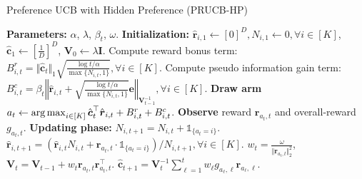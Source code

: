 \begin{algorithm}[t]
\caption{Preference UCB with Hidden Preference (PRUCB-HP)}
\label{alg:PRUCB_HP}
\begin{algorithmic}
\State \textbf{Parameters:}
$\alpha$, $\lambda$, $\beta_t$, $\omega$.
\State \textbf{Initialization:}
$\boldsymbol{\hat{r}}_{i,1} \!\leftarrow\! [0]^D, 
N_{i, 1} \!\leftarrow\! 0, \forall i \!\in\! [K]$, 
$\boldsymbol{\hat{c}}_1 \!\leftarrow\! [\frac{1}{D}]^D$, 
$\boldsymbol{V}_0 \!\leftarrow\! \lambda \boldsymbol{I}$.
    \State Compute reward bonus term: $B_{i,t}^{r} = \Vert \hat{\boldsymbol{c}}_t \Vert_1 \sqrt{\frac{\log{t/\alpha}}{\max\{N_{i,t}, 1\}}}, \forall i \in [K]$.
    \State Compute pseudo information gain term: $B_{i,t}^{c} = \beta_t \left \Vert \hat{\boldsymbol{r}}_{i,t} \!+\! \sqrt{\frac{\log{t/\alpha}}{\max\{N_{i,t}, 1\}}} \boldsymbol{e} \right \Vert_{\boldsymbol{V}_{t-1}^{-1}}, \forall i \in [K]$.
    \State \textbf{Draw arm} $a_t \leftarrow \operatorname*{arg\,max}_{i \in [K]} \hat{\boldsymbol{c}}_t^\top \hat{\boldsymbol{r}}_{i,t} + B_{i,t}^{r} + B_{i,t}^{c}$.
    \State \textbf{Observe} reward $\boldsymbol{r}_{a_t,t}$ and overall-reward $g_{a_t,t}$.
    \State \textbf{Updating phase:}
    \State \indent $N_{i, t+1} \!=\! N_{i, t} \!+\! \mathds{1}_{ \{a_{t} = i \}}$.
    \State \indent $\hat{\boldsymbol{r}}_{i,t+1} \!=\! (\hat{\boldsymbol{r}}_{i,t} N_{i, t} + \boldsymbol{r}_{a_{t}, t} \cdot \mathds{1}_{ \{a_{t} = i \}} )/N_{i, t+1}, \forall i \in [K]$.
    \State \indent $w_t = \frac{\omega}{\Vert \boldsymbol{r}_{a_t,t} \Vert_2^2}$, $\boldsymbol{V}_{t} = \boldsymbol{V}_{t-1} + w_t \boldsymbol{r}_{a_t,t}\boldsymbol{r}_{a_t,t}^{\top}$.
    \State \indent $\boldsymbol{\hat{c}}_{t+1} = \boldsymbol{V}_{t}^{-1} \sum_{\ell=1}^{t} w_{\ell} g_{a_{\ell}, \ell} \boldsymbol{r}_{a_{\ell},\ell}$.
\EndFor
\end{algorithmic}
\end{algorithm}


